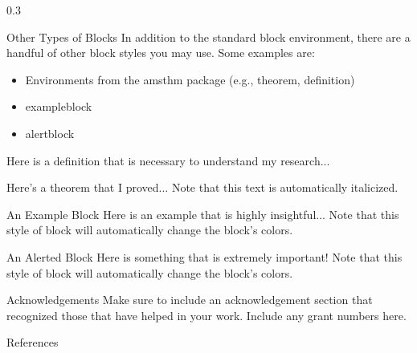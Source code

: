 \documentclass{msuposter}
\newcommand{\colwidth}{0.3\linewidth}
\begin{document}
\begin{frame}{}
\begin{columns}[t]
\begin{column}{\colwidth}
\begin{block}{Other Types of Blocks}
In addition to the standard {\ttfamily block} environment, there are a handful of other block styles you may use.  Some examples are:
\begin{itemize}
 \item Environments from the {\ttfamily amsthm} package (e.g., {\ttfamily theorem}, {\ttfamily definition})
 \item {\ttfamily exampleblock}
 \item {\ttfamily alertblock}
\end{itemize}
\end{block}

\begin{definition}[My Definition]
Here is a definition that is necessary to understand my research...
\end{definition}

\begin{theorem}
Here's a theorem that I proved...  Note that this text is automatically italicized.
\end{theorem}

\begin{exampleblock}{An Example Block}
Here is an example that is highly insightful...  Note that this style of block will automatically change the block's colors.
\end{exampleblock}

\begin{alertblock}{An Alerted Block}
Here is something that is extremely important!  Note that this style of block will automatically change the block's colors.
\end{alertblock}

\begin{block}{Acknowledgements}
Make sure to include an acknowledgement section that recognized those that have helped in your work. Include any grant numbers here. 
\end{block}

\begin{block}{References} %
\scriptsize


\end{block}

\end{column}

\end{columns}
\end{frame}
\end{document}
